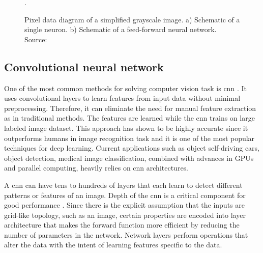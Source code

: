             \begin{figure}[ht]
                \centering
                \qquad
                \caption{Pixel data diagram of a simplified grayscale image. a) Schematic of a single neuron. b) Schematic of a feed-forward neural network. Source: \cite{nnfurtado}}.
                \label{fig:neuron and neural network}
            \end{figure}
            
    \subsection{Convolutional neural network}\label{convolutional_neural_network}
        One of the most common methods for solving computer vision task is \gls{cnn} \cite{krizhevsky2012imagenet, lecun1989backpropagation, goodfellow2016deep}. It uses convolutional layers to learn features from input data without minimal preprocessing. Therefore, it can eliminate the need for manual feature extraction as in traditional methods. The features are learned while the \gls{cnn} trains on large labeled image dataset. This approach has shown to be highly accurate since it outperforms humans in image recognition task \cite{russakovsky2015imagenet} and it is one of the most popular techniques for deep learning. Current applications such as object self-driving cars, object detection, medical image classification, combined with advances in GPUs and parallel computing, heavily relies on \gls{cnn} architectures. 

        A \gls{cnn} can have tens to hundreds of layers that each learn to detect different patterns or features of an image. Depth of the \gls{cnn} is a critical component for good performance \cite{russakovsky2015imagenet}. Since there is the explicit assumption that the inputs are grid-like topology, such as an image, certain properties are encoded into layer architecture that makes the forward function more efficient by reducing the number of parameters in the network. Network layers perform operations that alter the data with the intent of learning features specific to the data. 
        
